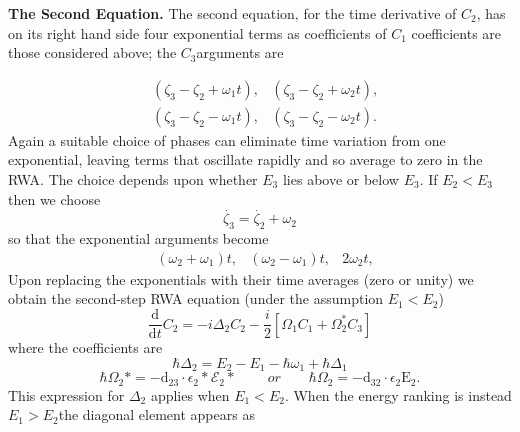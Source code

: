 \documentclass{book}
\begin{document}
\bigskip\noindent
\textbf{The Second Equation.} The second equation, for the time derivative of $ C_2 $, has on its right hand side four exponential terms as coefficients of $ C_1 $ coefficients are those considered above; the $ C_3 $arguments are
\iffalse
\begin{itemize}
	\item $ ( \zeta _3 - \zeta _2 + \omega _1 t ) $,
	\item $ ( \zeta _3 - \zeta _2 + \omega _2 t ) $,
	\item $ ( \zeta _3 - \zeta _2 - \omega _1 t ) $,
	\item $ ( \zeta _3 - \zeta _2 - \omega _2 t ) $.
\end{itemize}
\fi
\begin{align*}
	& ( \zeta _3 - \zeta _2 + \omega _1 t ),
	& ( \zeta _3 - \zeta _2 + \omega _2 t ),\\
	& ( \zeta _3 - \zeta _2 - \omega _1 t ),
	& ( \zeta _3 - \zeta _2 - \omega _2 t ).
\end{align*}
Again a suitable choice of phases can eliminate time variation from one exponential, leaving terms that oscillate rapidly and so average to zero in the RWA. The choice depends upon whether $ E_3 $ lies above or below $ E_3 $. If $ E_2 < E_3 $then we choose
\begin{equation}
\dot{ \zeta _3 } = \dot{ \zeta _2 } + \omega _2
\end{equation}
so that the exponential arguments become
\begin{align*}
	& ( \omega _2 + \omega _1 ) t,
	& ( \omega _2 - \omega _1 ) t,
	& 2 \omega _2 t,
\end{align*}
Upon replacing the exponentials with their time averages (zero or unity) we obtain the second-step RWA equation (under the assumption $ E_1 < E_2 $)
\begin{equation}\label{eq:13.1-12}
	\frac{\mathrm d}{\mathrm d t} C_2 = - i \Delta _2 C_2 - \frac{i}{2} [ \Omega _1 C_1 + \Omega _2^* C_3]
\end{equation}
where the coefficients are
\begin{equation}
	\hbar \Delta _2 = E_2  - E_1 - \hbar \omega _1 + \hbar \Delta _1
\end{equation}
\begin{equation}
\label{eq:13.1-13b}
	\hbar \Omega _2 * = - \mathrm {d_{23}} \cdot \epsilon _2 * \mathcal{E}_2 *\
	\qquad or \qquad \hbar \Omega _2 = - \mathrm{d_{32}} \cdot \epsilon _2 \mathrm{E}_2.
\end{equation}
This expression for $ \Delta _2 $ applies when $ E_1 < E_2 $. When the energy ranking is instead $ E_1 > E_2 $the diagonal element appears as
\end{document}
